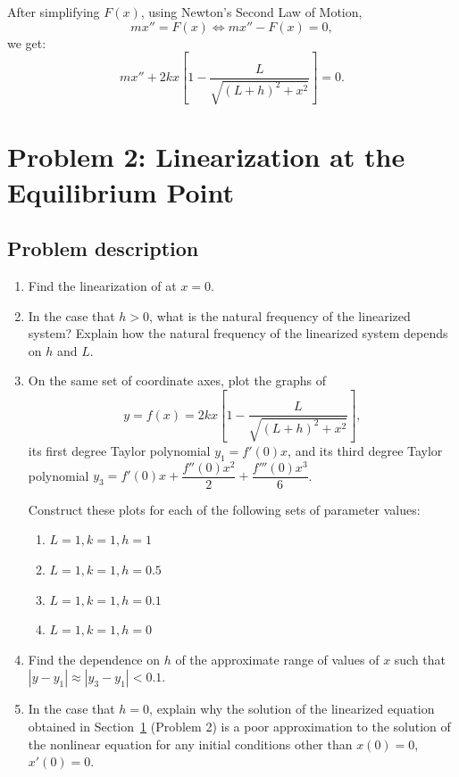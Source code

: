 \documentclass[12pt, a4paper]{report}
\renewcommand{\eqref}[1]{\originaleqref{#1}}
\newcommand{\secref}{Section~\ref}
\begin{document}
	After simplifying $F(x)$, using Newton's Second Law of Motion,
	\begin{equation*}
		mx'' = F(x) \Leftrightarrow mx'' - F(x) = 0,
	\end{equation*}
	we get:
	\begin{equation*}
		\boxed{mx'' + 2kx \left[1 - \frac{L}{\sqrt{(L + h)^2 + x^2}}\right] = 0.} \tag*{\(\square\)}
	\end{equation*}
	
	\section{Problem 2: Linearization at the Equilibrium Point} \label{sec:problem2}
	\subsection{Problem description}
	\begin{enumerate}[label=\textbf{(\arabic*)}]
		\item Find the linearization of \eqref{eq:problem1:1} at $x = 0$.
		\item In the case that $h > 0$, what is the natural frequency of the linearized system? Explain how the natural frequency of the linearized system depends on $h$ and $L$.
		\item On the same set of coordinate axes, plot the graphs of
		\[
		y = f(x) = 2kx \left[ 1 - \dfrac{L}{\sqrt{(L + h)^2 + x^2}} \right],
		\]
		its first degree Taylor polynomial $y_1 = f'(0)x$, and its third degree Taylor polynomial $y_3 = f'(0)x + \dfrac{f''(0)x^2}{2} + \dfrac{f'''(0)x^3}{6}$.
		
		Construct these plots for each of the following sets of parameter values:
		\begin{enumerate}[label=\textbf{\color{blue}\roman*.}]
			\item $L = 1, k = 1, h = 1$
			\item $L = 1, k = 1, h = 0.5$
			\item $L = 1, k = 1, h = 0.1$
			\item $L = 1, k = 1, h = 0$
		\end{enumerate}
		
		\item Find the dependence on $h$ of the approximate range of values of $x$ such that $|y - y_1| \approx |y_3 - y_1| < 0.1$.
		\item In the case that $h = 0$, explain why the solution of the linearized equation obtained in \secref{sec:problem2} (Problem 2) is a poor approximation to the solution of the nonlinear equation \eqref{eq:problem1:1} for any initial conditions other than $x(0) = 0$, $x'(0) = 0$.
	\end{enumerate}
	
\end{document}
